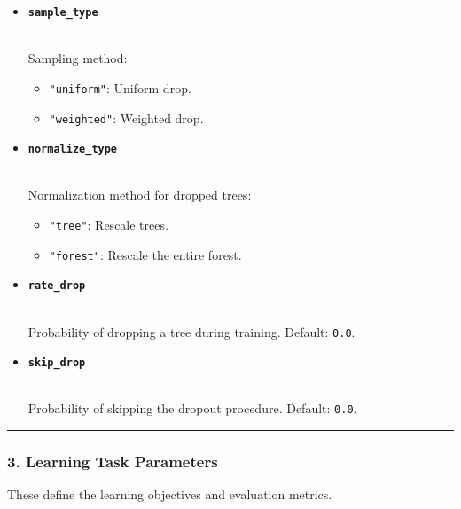 \documentclass[12pt]{book}
\providecommand{\tightlist}{%
  \setlength{\itemsep}{0pt}\setlength{\parskip}{0pt}}
\begin{document}
\begin{itemize}
\item
  \textbf{\texttt{sample\_type}}\strut \\
  Sampling method:

  \begin{itemize}
  \tightlist
  \item
    \texttt{"uniform"}: Uniform drop.
  \item
    \texttt{"weighted"}: Weighted drop.
  \end{itemize}
\item
  \textbf{\texttt{normalize\_type}}\strut \\
  Normalization method for dropped trees:

  \begin{itemize}
  \tightlist
  \item
    \texttt{"tree"}: Rescale trees.
  \item
    \texttt{"forest"}: Rescale the entire forest.
  \end{itemize}
\item
  \textbf{\texttt{rate\_drop}}\strut \\
  Probability of dropping a tree during training. Default: \texttt{0.0}.
\item
  \textbf{\texttt{skip\_drop}}\strut \\
  Probability of skipping the dropout procedure. Default: \texttt{0.0}.
\end{itemize}

\begin{center}\rule{0.5\linewidth}{0.5pt}\end{center}

\subsubsection{\texorpdfstring{\textbf{3. Learning Task
Parameters}}{3. Learning Task Parameters}}\label{learning-task-parameters}

These define the learning objectives and evaluation metrics.
\end{document}
